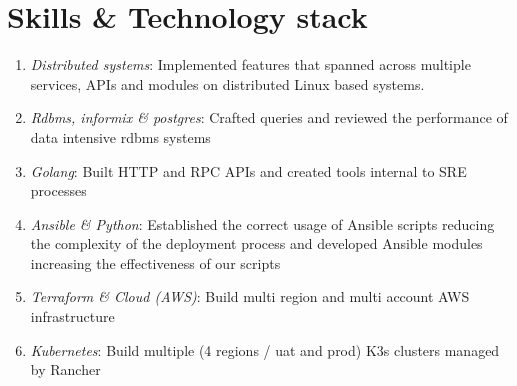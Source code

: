 \documentclass{CVSoftwareEngineer}
\begin{document}
	\section{Skills \& Technology stack}
	\begin{enumerate}[labelwidth=!, labelindent=0pt, leftmargin=*, rightmargin=15pt]
		\itemsep0em
		\item[\textasteriskcentered] \textit{Distributed systems}: Implemented features that spanned across multiple services,
			APIs and modules on distributed Linux based systems.
		\item[\textasteriskcentered] \textit{Rdbms, informix \& postgres}: Crafted queries and reviewed the performance of data
			intensive rdbms systems
		\item[\textasteriskcentered] \textit{Golang}: Built HTTP and RPC APIs and created tools internal to SRE processes
		\item[\textasteriskcentered] \textit{Ansible \& Python}: Established the correct usage of Ansible scripts reducing the complexity
			of the deployment process and developed Ansible modules increasing the effectiveness of our scripts
		\item[\textasteriskcentered] \textit{Terraform \& Cloud (AWS)}: Build multi region and multi account AWS infrastructure
		\item[\textasteriskcentered] \textit{Kubernetes}: Build multiple (4 regions / uat and prod) K3s clusters managed by Rancher
	\end{enumerate}
\end{document}
